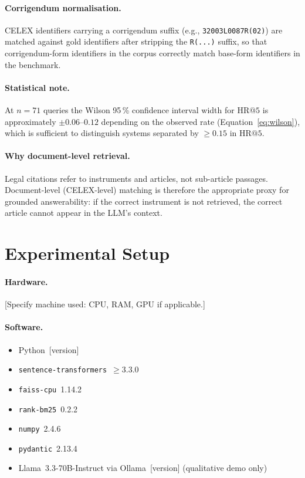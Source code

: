 \documentclass{iosart2x}
\makeatletter
\newcommand{\HR}[1]{\text{HR}@{#1}}
\makeatother
\begin{document}
\paragraph{Corrigendum normalisation.}  CELEX identifiers carrying a
corrigendum suffix (e.g., \texttt{32003L0087R(02)}) are matched
against gold identifiers after stripping the \texttt{R(...)} suffix,
so that corrigendum-form identifiers in the corpus correctly match
base-form identifiers in the benchmark.

\paragraph{Statistical note.}  At $n{=}71$ queries the Wilson 95\,\%
confidence interval width for $\HR{5}$ is approximately $\pm 0.06$--$0.12$
depending on the observed rate (Equation~\ref{eq:wilson}), which is
sufficient to distinguish systems separated by $\geq 0.15$ in
$\HR{5}$.

\paragraph{Why document-level retrieval.}  Legal citations refer to
instruments and articles, not sub-article passages.  Document-level
(CELEX-level) matching is therefore the appropriate proxy for grounded
answerability: if the correct instrument is not retrieved, the correct
article cannot appear in the LLM's context.

\section{Experimental Setup}
\label{sec:setup}

\paragraph{Hardware.}  [Specify machine used: CPU, RAM, GPU if applicable.]

\paragraph{Software.}
\begin{itemize}
  \item Python~[version]
  \item \texttt{sentence-transformers}~$\geq$3.3.0
  \item \texttt{faiss-cpu}~1.14.2
  \item \texttt{rank-bm25}~0.2.2
  \item \texttt{numpy}~2.4.6
  \item \texttt{pydantic}~2.13.4
  \item Llama~3.3-70B-Instruct via Ollama~[version] (qualitative demo only)
\end{itemize}
\end{document}
